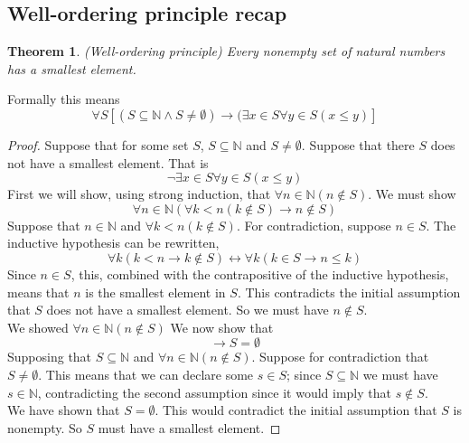 \documentclass{report}
\newtheorem*{theorem}{Theorem}
\theoremstyle{definition}
\begin{document}
\subsection{Well-ordering principle recap}
\begin{theorem}
(Well-ordering principle) Every nonempty set of natural numbers has a smallest element. 
\end{theorem}
\noindent Formally this means
\begin{equation*}
\forall S[(S\subseteq\mathbb N\land S\neq\emptyset)\to(\exists x\in S\forall y\in S(x\leq y)]
\end{equation*}
\begin{proof}
Suppose that for some set $S$, $S\subseteq\mathbb N$ and $S\neq\emptyset$. Suppose that there $S$ does not have a smallest element. That is
\begin{equation*}
\neg\exists x\in S\forall y\in S(x\leq y)
\end{equation*}
First we will show, using strong induction, that $\forall n\in\mathbb N(n\notin S)$. We must show
\begin{equation*}
\forall n\in\mathbb N(\forall k<n(k\notin S)\to n\notin S)
\end{equation*}
Suppose that $n\in\mathbb N$ and $\forall k<n(k\notin S)$. For contradiction, suppose $n\in S$. The inductive hypothesis can be
rewritten,
\begin{equation*}
\forall k(k<n\to k\notin S)\leftrightarrow\forall k(k\in S\to n\leq k)
\end{equation*}
Since $n\in S$, this, combined with the contrapositive of the inductive hypothesis, means that $n$ is the smallest element in $S$. 
This contradicts the initial assumption that $S$ does not have a smallest element. So we must have $n\notin S$.\\
\indent We showed $\forall n\in\mathbb N(n\notin S)$ We now show that 
\begin{equation*}
[S\subseteq\mathbb N\land\forall n\in\mathbb N(n\notin S)]\rightarrow S=\emptyset
\end{equation*}
Supposing that $S\subseteq\mathbb N$ and $\forall n\in\mathbb N(n\notin S)$. Suppose for contradiction that $S\neq\emptyset$. This means that
we can declare some $s\in S$; since $S\subseteq\mathbb N$ we must have $s\in\mathbb N$, contradicting the second assumption since 
it would imply that $s\notin S$.\\
\indent We have shown that $S=\emptyset$. This would contradict the initial assumption that $S$ is nonempty. So $S$ must have a smallest element.
\end{proof}
\newpage
\end{document}

